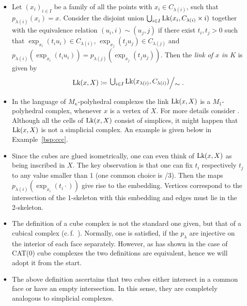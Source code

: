 \begin{defin}
\begin{itemize}
  \item Let \((x_i)_{i \in I}\) be a family of all the points with \(x_i \in C_{\lambda(i)}\), such that \(p_{\lambda(i)}(x_i) = x\). Consider the disjoint union \(\bigcup_{i \in I} \operatorname{Lk}(x_i, C_{\lambda(i)} \times {i})\) together with the equivalence relation \((u_i, i) \sim (u_j, j)\) if there exist \(t_i, t_j > 0\) such that \(\exp_{x_i}(t_i u_i) \in C_{\lambda(i)}\), \(\exp_{x_j}(t_j u_j) \in C_{\lambda(j)}\) and \(p_{\lambda(i)}(\exp_{x_i}(t_i u_i)) = p_{\lambda(j)}(\exp_{x_j}(t_j u_j))\). Then the \emph{link of \(x\) in \(K\)} is given by
    \begin{align*}
      \lk(x, X) \coloneqq \quot{\bigcup_{i \in I} \lk(x_{\lambda(i)}, C_{\lambda(i)})}{\sim}.
    \end{align*}
  \end{itemize}
\end{defin}

\begin{rem}
  \label{rem:complex}
  \begin{itemize}
  \item In the language of \(M_\kappa\)-polyhedral complexes the link \(\operatorname{Lk}(x, X)\) is a \(M_1\)-polyhedral complex, whenever \(x\) is a vertex of \(X\). For more details consider \textcite[Section~I.7]{MR1744486}. Although all the cells of \(\operatorname{Lk}(x,X)\) consist of simplices, it might happen that \(\operatorname{Lk}(x,X)\) is not a simplicial complex. An example is given below in Example~\ref{bsp:ccc}.
  \item Since the cubes are glued isometrically, one can even think of \(\operatorname{Lk}(x,X)\) as being inscribed in \(X\). The key observation is that one can fix \(t_i\) respectively \(t_j\) to any value smaller than 1 (one common choice is {/3}). Then the maps \(p_{\lambda(i)}(\exp_{x_i}(t_i \cdot))\) give rise to the embedding. Vertices correspond to the intersection of the 1-skeleton with this embedding and edges must lie in the 2-skeleton.
  \item The definition of a cube complex is not the standard one given, but that of a cubical complex (c.\,f.~\cite[Def.~I.7.37]{MR1744486}). Normally, one is satisfied, if the \(p_\lambda\) are injective on the interior of each face separately. However, as \textcite[Thm.~C.4]{MR3029427} has shown in the case of CAT(0) cube complexes the two definitions are equivalent, hence we will adopt it from the start.
  \item The above definition ascertains that two cubes either intersect in a common face or have an empty intersection. In this sense, they are completely analogous to simplicial complexes. 
  \end{itemize}
\end{rem}

